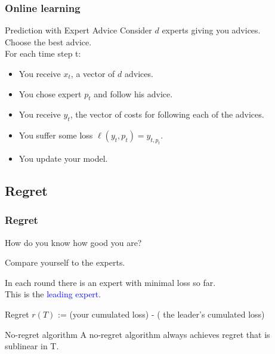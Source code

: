 \documentclass{beamer}
\begin{document}
\begin{frame}
	\frametitle{Online learning}
	\begin{block}{Prediction with Expert Advice}
		Consider $d$ experts giving you advices.\\
		Choose the best advice.\\ 
		
		For each time step t:\pause
		\begin{itemize}
			\item You receive $x_t$, a vector of $d$ advices. \pause 
			\item You chose expert $p_t$ and follow his advice. \pause
			\item You receive $y_t$, the vector of costs for following each of the advices. \pause
			\item You suffer some loss $\ell(y_t,p_t) = y_{t,p_t}$. \pause
			\item You update your model.
		\end{itemize}
	\end{block}
\end{frame}

\subsection{Regret}
\begin{frame}
	\frametitle{Regret}

	How do you know how good you are?
	\pause
	
	Compare yourself to the experts.
	\pause
	
	\vspace{1em}
	In each round there is an expert with minimal loss so far.\\
	This is the \textcolor{blue}{leading expert}.
	\pause
	\begin{block}{Regret}
		$r(T)$ := (your cumulated loss) - ( the leader's cumulated loss)
	\end{block}

	\pause
	\begin{block}{No-regret algorithm}
		A no-regret algorithm always achieves regret that is sublinear in T.
	\end{block}

\end{frame}
\end{document}
